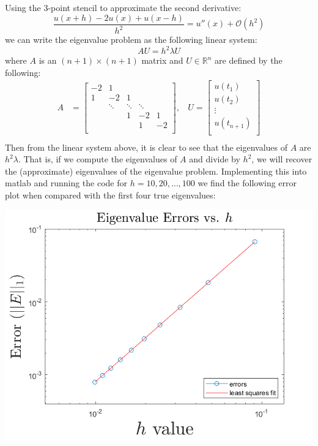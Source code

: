 \documentclass{article}
\begin{document}
\begin{enumerate}
    Using the 3-point stencil to approximate the second derivative:
    \[\frac{u(x + h) - 2u(x) + u(x - h)}{h^2} = u''(x) + \mathcal{O}(h^2)\]
    we can write the eigenvalue problem as the following linear system:
    \[AU = h^2\lambda U\]
    where $A$ is an $(n+1) \times (n+1)$ matrix and $U \in \mathbb{R}^n$ are defined by the following:
    \begin{align*}
        A &= \begin{bmatrix}
            -2 & 1 & & & \\
            1 & -2 & 1 & & \\
            & \ddots & \ddots & \ddots & \\
            &  & 1 & -2 & 1 \\
            & & & 1 & -2 \\
        \end{bmatrix}, \:\:\:\:  U = \begin{bmatrix}
            u(t_1) \\
            u(t_2) \\
            \vdots \\
            u(t_{n+1}) \\
        \end{bmatrix} \\
    \end{align*}
    Then from the linear system above, it is clear to see that the eigenvalues of $A$ are $h^2\lambda$. That is, if we compute the eigenvalues of $A$ and divide by $h^2$, we will recover the (approximate) eigenvalues of the eigenvalue problem. Implementing this into matlab and running the code for $h = 10,20,\dots, 100$ we find the following error plot when compared with the first four true eigenvalues:
    \begin{center}
        \includegraphics[scale = 0.45]{eigenvalueEerror.png}

\end{center}
\end{enumerate}
\end{document}
